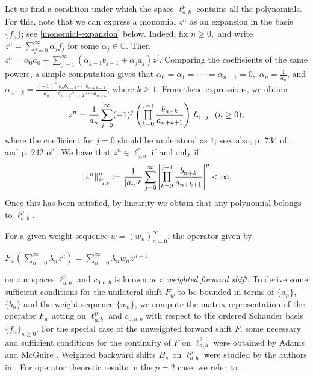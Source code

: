 \documentclass[12pt, reqno]{amsart}
\DeclareMathOperator*{\Mprod}{\text{\raisebox{0.25ex}{\scalebox{0.8}{$\prod$}}}}
\theoremstyle{definition}
\theoremstyle{remark}
\numberwithin{equation}{section}
\begin{document}
Let us find a condition under which the space $\ell^p_{a,b}$ contains all the polynomials. For this, note that we can express a monomial $z^n$ as an expansion in the basis $\{f_n\}$; see \eqref{monomial-expansion} below. Indeed, fix $n \geq 0,$ and write $z^{n}=\sum_{j=0}^{\infty}\alpha_{j}f_{j}$ for some $\alpha_{j} \in \mathbb{C}.$ Then $z^{n}=\alpha_{0}a_{0}+\sum_{j=1}^{\infty}(\alpha_{j-1}b_{j-1}+\alpha_{j}a_{j})z^{j}.$ Comparing the coefficients of the same powers, a simple computation gives that $\alpha_{0}=\alpha_{1}=\cdot \cdot \cdot=\alpha_{n-1}=0,$ $\alpha_{n}=\frac{1}{a_{n}}$, and $\alpha_{n+k}=\frac{(-1)^{k}}{a_{n}}\frac{b_{n}b_{n+1}\cdot\cdot \cdot b_{n+k-1}}{a_{n+1}a_{n+2}\cdot\cdot \cdot a_{n+k}}$, where $k\geq 1$. From these expressions, we obtain
\begin{equation}\label{monomial-expansion}
z^{n}=\frac{1}{a_{n}}\sum_{j=0}^{\infty}(-1)^{j}\left(\Mprod_{k=0}^{j-1}\frac{b_{n+k}}{a_{n+k+1}}\right)f_{n+j} \,\,\,\, (n\geq 0),
\end{equation}
where the coefficient for $j=0$ should be understood as $1$; see, also, p. $734$ of \cite{Adams-McGuire}, and p. 242 of \cite{Das-Mundayadan}. We have that $z^n \in \ell^p_{a,b}$ if and only if
\begin{equation} \label{m}
\|z^n\|_{\ell^p_{a,b}}^p:=\frac{1}{|a_{n}|^p}\sum_{j=0}^{\infty}\left|\Mprod_{k=0}^{j-1}\frac{b_{n+k}}{a_{n+k+1}}\right|^p<\infty.
\end{equation}
Once this has been satisfied, by linearity we obtain that any polynomial  belongs to $\ell^p_{a,b}.$

For a given weight sequence $w=(w_n)_{n=0}^{\infty}$, the operator given by 
\begin{center}
    $F_w(\sum_{n=0}^{\infty}\lambda_n z^n)=\sum_{n=0}^{\infty}\lambda_nw_nz^{n+1}$
    \end{center}
    on our spaces $\ell^p_{a,b}$ and $c_{0,a,b}$ is known as a \textit{weighted forward shift}. To derive some sufficient conditions for the unilateral shift $F_w$ to be bounded in terms of $\{a_n\}$, $\{b_n\}$ and the weight sequence $\{w_n\}$, we compute the matrix representation of the operator $F_w$ acting on $\ell^{p}_{a,b}$ and $c_{0,a,b}$ with respect to the ordered Schauder basis $\{f_n\}_{n\geq 0}$. For the special case of the unweighted forward shift $F$, some necessary and sufficient conditions for the continuity of $F$ on $\ell^2_{a,b}$ were obtained by Adams and McGuire \cite{Adams-McGuire}. Weighted backward shifts $B_w$ on $\ell^p_{a,b}$ were studied by the authors in \cite{Das-Mundayadan}. For operator theoretic results in the $p=2$ case, we refer to \cite{Das-Sarkar}.
 
\end{document}
